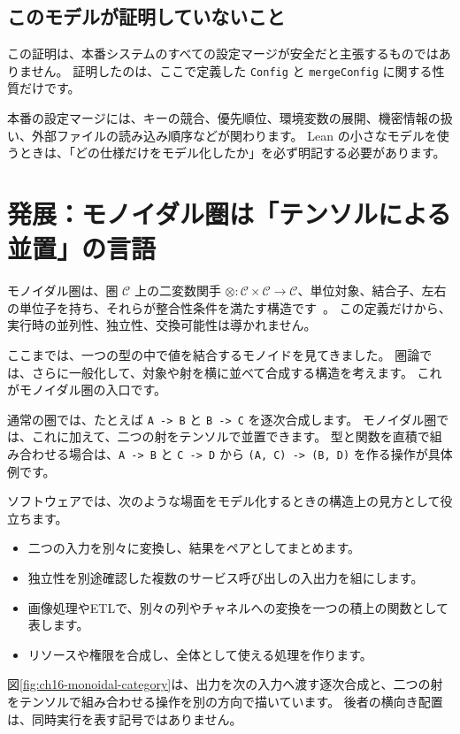 \subsection{このモデルが証明していないこと}

この証明は、本番システムのすべての設定マージが安全だと主張するものではありません。
証明したのは、ここで定義した \texttt{Config} と \texttt{mergeConfig} に関する性質だけです。

本番の設定マージには、キーの競合、優先順位、環境変数の展開、機密情報の扱い、外部ファイルの読み込み順序などが関わります。
Lean の小さなモデルを使うときは、「どの仕様だけをモデル化したか」を必ず明記する必要があります。

\section{発展：モノイダル圏は「テンソルによる並置」の言語}

モノイダル圏は、圏 \(\mathcal C\) 上の二変数関手
\(\otimes : \mathcal C \times \mathcal C \to \mathcal C\)、単位対象、結合子、左右の単位子を持ち、それらが整合性条件を満たす構造です~\cite{riehl-category-theory-in-context}。
この定義だけから、実行時の並列性、独立性、交換可能性は導かれません。

ここまでは、一つの型の中で値を結合するモノイドを見てきました。
圏論では、さらに一般化して、対象や射を横に並べて合成する構造を考えます。
これがモノイダル圏の入口です。

通常の圏では、たとえば \texttt{A -> B} と \texttt{B -> C} を逐次合成します。
モノイダル圏では、これに加えて、二つの射をテンソルで並置できます。
型と関数を直積で組み合わせる場合は、\texttt{A -> B} と \texttt{C -> D} から
\texttt{(A, C) -> (B, D)} を作る操作が具体例です。

ソフトウェアでは、次のような場面をモデル化するときの構造上の見方として役立ちます。

\begin{itemize}
\item 二つの入力を別々に変換し、結果をペアとしてまとめます。
\item 独立性を別途確認した複数のサービス呼び出しの入出力を組にします。
\item 画像処理やETLで、別々の列やチャネルへの変換を一つの積上の関数として表します。
\item リソースや権限を合成し、全体として使える処理を作ります。
\end{itemize}

図\ref{fig:ch16-monoidal-category}は、出力を次の入力へ渡す逐次合成と、二つの射をテンソルで組み合わせる操作を別の方向で描いています。
後者の横向き配置は、同時実行を表す記号ではありません。

